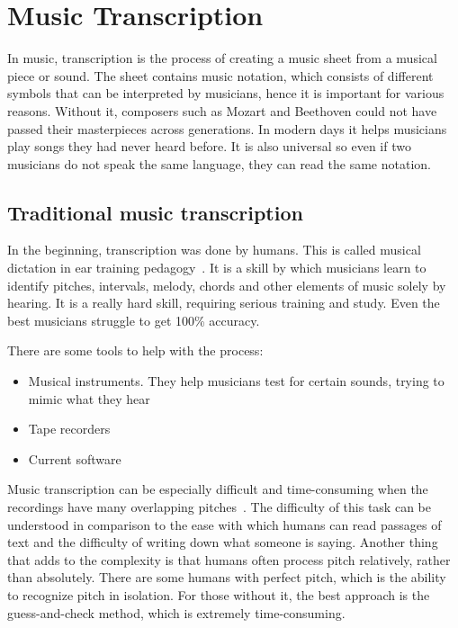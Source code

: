 \section{Music Transcription}
In music, transcription is the process of creating a music sheet from a musical piece or sound. The sheet contains music notation, which consists of different symbols that can be interpreted by musicians, hence it is important for various reasons. Without it, composers such as Mozart and Beethoven could not have passed their masterpieces across generations. In modern days it helps musicians play songs they had never heard before. It is also universal so even if two musicians do not speak the same language, they can read the same notation.

\subsection{Traditional music transcription}
In the beginning, transcription was done by humans. This is called musical dictation in ear training pedagogy~\cite{human_transcription}. It is a skill by which musicians learn to identify pitches, intervals, melody, chords and other elements of music solely by hearing. It is a really hard skill, requiring serious training and study. Even the best musicians struggle to get 100\% accuracy. \par

There are some tools to help with the process:
\begin{itemize}
	\item Musical instruments. They help musicians test for certain sounds, trying to mimic what they hear
	\item Tape recorders
	\item Current software
\end{itemize}
\par

Music transcription can be especially difficult and time-consuming when the recordings have many overlapping pitches~\cite{music_retrieval}. The difficulty of this task can be understood in comparison to the ease with which humans can read passages of text and the difficulty of writing down what someone is saying. Another thing that adds to the complexity is that humans often process pitch relatively, rather than absolutely. There are some humans with perfect pitch, which is the ability to recognize pitch in isolation. For those without it, the best approach is the guess-and-check method, which is extremely time-consuming.

